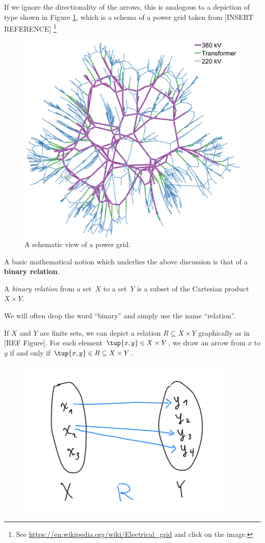 If we ignore the directionality of the arrows, this is analogous to a depiction of type shown in Figure \ref{fig:power_schema}, which is a schema of a power grid taken from [INSERT REFERENCE] \footnote{See \url{https://en.wikipedia.org/wiki/Electrical_grid} and click on the image.} 

\begin{figure}[h!]
\centering
 \includegraphics[width=0.7\linewidth]{pics/power_dist_network.png}
 \caption{A schematic view of a power grid.}
\label{fig:power_schema}
\end{figure}


A basic mathematical notion which underlies the above discussion is that of a \textbf{binary relation}. 

\begin{definition}
A \emph{binary relation} from a set~$X$ to a set~$Y$ is a subset of the Cartesian product $X\times Y$. 
\end{definition}

\begin{remark}
We will often drop the word ``binary'' and simply use the name ``relation''.  
\end{remark}

If $X$ and $Y$ are finite sets, we can depict a relation $R \subseteq X \times Y$ graphically as in [REF Figure]. For each element $\tup{x,y} \in X \times Y$, we draw an arrow from $x$ to $y$ if and only if $\tup{x,y} \in R \subseteq X \times Y$. 

\begin{figure}[h!]
\centering
 \includegraphics[width=0.5\linewidth]{pics/dist_net_7.png}
 \caption{}
\label{fig:example_rel}
\end{figure}


